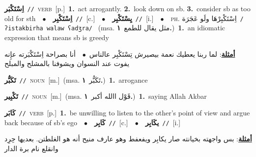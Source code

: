 \documentclass[10pt,a4paper,twoside]{article} %
\begin{document}
\begin{multicols}{2}
{\setlength\topsep{0pt}\textbf{\foreignlanguage{arabic}{اِسْتَكْبَر}}\ {\color{gray}\texttt{//}\color{black}}\ \textsc{verb}\ [p.]\ \textbf{1.}~act arrogantly.  \textbf{2.}~look down on sb.  \textbf{3.}~consider sb as too old for sth\ \ $\bullet$\ \ \setlength\topsep{0pt}\textbf{\foreignlanguage{arabic}{اِسْتَكْبِر}}\ {\color{gray}\texttt{//}\color{black}}\ [c.]\ \ $\bullet$\ \ \setlength\topsep{0pt}\textbf{\foreignlanguage{arabic}{يِسْتَكْبِر}}\ {\color{gray}\texttt{//}\color{black}}\ [i.]\ \ $\bullet$\ \ \textsc{ph.} \color{gray} \foreignlanguage{arabic}{اِسْتَكْبِرْهَا ولَو عَجَرَة}\color{black}\ {\color{gray}\texttt{/{\sffamily ʔistakbirha walaw ʕadʒra}/}\color{black}}\ \color{gray} (msa. \foreignlanguage{arabic}{مثل يقال للطمع}~\foreignlanguage{arabic}{\textbf{١.}})\color{black}\ \textbf{1.}~an idiomatic expression that means sb is greedy\  \begin{flushright}\color{gray}\foreignlanguage{arabic}{\textbf{\underline{\foreignlanguage{arabic}{أمثلة}}}: لما ربنا يعطيك نعمة بيصيرش تِسْتَكْبِر عالناس\ $\bullet$\ \  أنا بصراحة اِسْتَكْبَرته عإِنه يفوت عند النسوان ويشوفنا بالمشلح والمبلح}\end{flushright}\color{black}} \vspace{2mm}

{\setlength\topsep{0pt}\textbf{\foreignlanguage{arabic}{تَكَبُّر}}\ {\color{gray}\texttt{//}\color{black}}\ \textsc{noun}\ [m.]\ \color{gray}(msa. \foreignlanguage{arabic}{تَكَبُّر}~\foreignlanguage{arabic}{\textbf{١.}})\color{black}\ \textbf{1.}~arrogance\ } \vspace{2mm}

{\setlength\topsep{0pt}\textbf{\foreignlanguage{arabic}{تَكْبِير}}\ {\color{gray}\texttt{//}\color{black}}\ \textsc{noun}\ [m.]\ \color{gray}(msa. \foreignlanguage{arabic}{قَوْل االله أكبر}~\foreignlanguage{arabic}{\textbf{١.}})\color{black}\ \textbf{1.}~saying Allah Akbar\ } \vspace{2mm}

{\setlength\topsep{0pt}\textbf{\foreignlanguage{arabic}{كَابَر}}\ {\color{gray}\texttt{//}\color{black}}\ \textsc{verb}\ [p.]\ \textbf{1.}~be unwilling to listen to the other's point of view and argue back because of sb's ego\ \ $\bullet$\ \ \setlength\topsep{0pt}\textbf{\foreignlanguage{arabic}{كَابِر}}\ {\color{gray}\texttt{//}\color{black}}\ [c.]\ \ $\bullet$\ \ \setlength\topsep{0pt}\textbf{\foreignlanguage{arabic}{يكَابِر}}\ {\color{gray}\texttt{//}\color{black}}\ [i.]\  \begin{flushright}\color{gray}\foreignlanguage{arabic}{\textbf{\underline{\foreignlanguage{arabic}{أمثلة}}}: بس واجهته بخيانته صار يكابِر ويفعفط وهو عارف منيح أنه هو الغلطتن. بعديها حِرِد وانقلع نام برة الدار}\end{flushright}\color{black}} \vspace{2mm}


\end{multicols}
\end{document}
